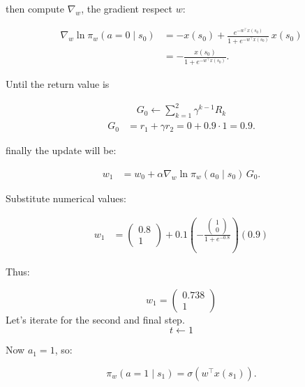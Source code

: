 \documentclass[main.tex]{subfiles}
\begin{document}
	then compute $\nabla_w$, the gradient respect $w$:
	
	\begin{align}
		\label{eq:gradient_log_clean}
		\nabla_w \ln \pi_w(a = 0 \mid s_0)
		&= -x(s_0)
		+ \frac{e^{-w^\top x(s_0)}}{1 + e^{-w^\top x(s_0)}}\, x(s_0) \\
		&= -\frac{x(s_0)}{1 + e^{-w^\top x(s_0)}} .
	\end{align}
	
	Until the return value is 
	
	\begin{align}
		G_0 \leftarrow \sum_{k=1}^{2} \gamma^{k-1}R_k
	\end{align}
	\begin{align*}
		G_0 &= r_1 + \gamma r_2 = 0 + 0.9 \cdot 1 = 0.9 .
	\end{align*}
	
	finally the update will be:
	
	\begin{align}
		w_1 &= w_0 + \alpha \nabla_w \ln\pi_w(a_0 \mid s_0) \, G_0.
	\end{align}
	
	Substitute numerical values:
	
	\begin{align}
		w_1 &= 
		\begin{pmatrix} 0.8 \\ 1 \end{pmatrix}
		+ 0.1 
		\left(
		- \frac{\begin{pmatrix} 1 \\ 0 \end{pmatrix}}
		{1 + e^{-0.8}}
		\right)
		(0.9)
	\end{align}
	
	Thus:
	
	\begin{equation}
		\boxed{
			w_1 = 
			\begin{pmatrix}
				0.738 \\
				1
			\end{pmatrix}
		}
	\end{equation}
	Let's iterate for the second and final step.
	\begin{equation*}
		t \leftarrow 1
	\end{equation*}
	
	Now $a_1 = 1$, so:
	
	\begin{equation}
		\pi_w(a=1 \mid s_1) = \sigma(w^\top x(s_1)).
	\end{equation}
	
\end{document}
